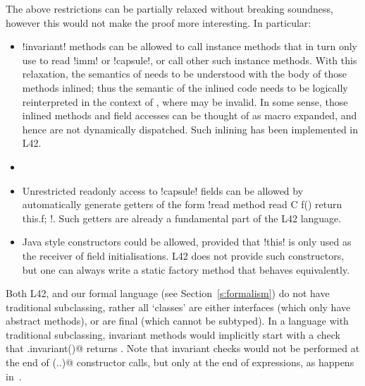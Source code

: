 The above restrictions can be partially relaxed without breaking soundness, however this would not make the proof more interesting. In particular:
\begin{itemize}
	\item \Q!invariant! methods can be allowed to call instance methods that in turn only use \Q@this@ to read \Q!imm! or \Q!capsule!, or call other such instance methods. With this relaxation, the semantics of \Q@invariant@ needs to be understood with the body of those methods inlined; thus the semantic of the inlined code needs to be logically reinterpreted in the context of \Q@invariant@, where \Q@this@ may be invalid. In some sense, those inlined methods and field accesses can be thought of as macro expanded, and hence are not dynamically dispatched. Such inlining has been implemented in L42.
 \item {}
	\item Unrestricted readonly access to \Q!capsule! fields can be allowed by automatically generate getters of the form \Q!read method read C f() { return this.f; }!. Such getters are already a fundamental part of the L42 language.
	
	\item Java style constructors could be allowed, provided that \Q!this! is only used as the receiver of field initialisations. L42 does not provide such constructors, but one can always write a static factory method that behaves equivalently.
\end{itemize}
Both L42, and our formal language (see Section~\ref{s:formalism}) do not have traditional subclassing, rather all `classes' are either interfaces (which only have abstract methods), or are final (which cannot be subtyped). In a language with traditional subclassing, invariant methods would implicitly start with a check that \Q@super.invariant()@ returns \Q@true@. Note that invariant checks would not be performed at the end of \Q@super(..)@ constructor calls, but only at the end of \Q@new@ expressions, as happens in~\cite{feldman2006jose}.

